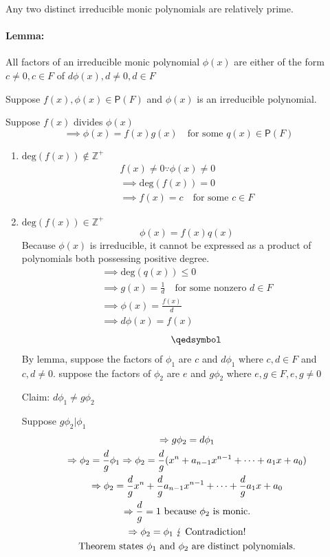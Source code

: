 Any two distinct irreducible monic polynomials are relatively prime.

\paragraph{Lemma: } All factors of an irreducible monic polynomial
$\phi(x)$ are either of the form $c \neq 0, c \in F$ of $d\phi(x), d
\neq 0, d \in F$

Suppose $f(x), \phi(x) \in \mathsf{P}(F)$ and $\phi(x)$ is an
irreducible polynomial.

Suppose $f(x)$ divides $\phi(x)$
\begin{equation}
\implies \phi(x) = f(x)g(x)\quad \text{for some } q(x) \in
\mathsf{P}(F)
\end{equation}
\begin{enumerate}[{\bf {Case} 1}]
\item $\text{deg}(f(x)) \notin \mathbb{Z}^+$
\begin{gather}
f(x)\neq 0 \because \phi(x) \neq 0\\
\implies \text{deg}(f(x)) = 0 \\
\implies f(x) = c \quad \text{for some } c \in F
\end{gather}
\item$\text{deg}(f(x)) \in \mathbb{Z}^+$
\begin{equation}
\phi(x) = f(x)q(x)
\end{equation}
Because $\phi(x)$ is irreducible, it cannot be expressed as a product
of polynomials both possessing positive degree.
\begin{gather}
\implies \text{deg}(q(x)) \leq 0 \\
\implies g(x) = \frac{1}{d} \quad \text{for some nonzero } d \in F\\
\implies \phi(x) = \frac{f(x)}{d}\\
\implies d\phi(x) = f(x)
\end{gather}
\begin{align}
\notag & & & & \qedsymbol
\end{align}
\newpage{}
By lemma, suppose the factors of $\phi_1$ are $c$ and $d\phi_1$ where
$c,d \in F$ and $c,d\neq 0.$ suppose the factors of $\phi_2$ are $e$
and $g\phi_2$ where $e,g \in F, e,g \neq 0$

Claim: $d\phi_1 \neq g\phi_2$

Suppose $g\phi_2 | \phi_1$
\begin{gather}
\implies g\phi_2 = d\phi_1\\
\implies \phi_2 = \frac{d}{g}\phi_1
\implies \phi_2 = \frac{d}{g}(x^n +a_{n-1}x^{n-1} + \dotsb +a_1x + a_0)\\
\implies \phi_2 = \frac{d}{g}x^n +\frac{d}{g}a_{n-1}x^{n-1} + \dotsb +
\frac{d}{g}a_1x + a_0\\
\implies \frac{d}{g} = 1\text{ because } \phi_2 \text{ is monic.} \\
\implies \phi_2 = \phi_1\; \lightning \text{ Contradiction!} \\
\text{Theorem states } \phi_1 \text{ and } \phi_2 \text{ are distinct
  polynomials.} \notag
\end{gather}
\end{enumerate}

